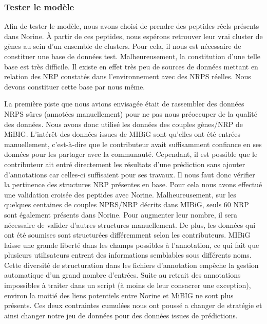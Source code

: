 \subsubsection{Tester le modèle}

Afin de tester le modèle, nous avons choisi de prendre des peptides réels présents dans Norine.
À partir de ces peptides, nous espérons retrouver leur vrai cluster de gènes au sein d'un ensemble de clusters.
Pour cela, il nous est nécessaire de constituer une base de données test.
Malheureusement, la constitution d'une telle base est très difficile.
Il existe en effet très peu de sources de données mettant en relation des NRP constatés dans l'environnement avec des NRPS réelles.
Nous devons constituer cette base par nous même.

La première piste que nous avions envisagée était de rassembler des données NRPS sûres (annotées manuellement) pour ne pas nous préoccuper de la qualité des données.
Nous avons donc utilisé les données des couples gènes/NRP de MiBIG.
L'intérêt des données issues de MIBiG sont qu'elles ont été entrées manuellement, c'est-à-dire que le contributeur avait suffisamment confiance en ses données pour les partager avec la communauté.
Cependant, il est possible que le contributeur ait entré directement les résultats d'une prédiction sans ajouter d'annotations car celles-ci suffisaient pour ses travaux.
Il nous faut donc vérifier la pertinence des structures NRP présentes en base.
Pour cela nous avons effectué une validation croisée des peptides avec Norine.
Malheureusement, sur les quelques centaines de couples NPRS/NRP décrits dans MIBiG, seuls 60 NRP sont également présents dans Norine.
Pour augmenter leur nombre, il sera nécessaire de valider d'autres structures manuellement.
De plus, les données qui ont été soumises sont structurées différemment selon les contributeurs.
MIBiG laisse une grande liberté dans les champs possibles à l'annotation, ce qui fait que plusieurs utilisateurs entrent des informations semblables sous différents noms.
Cette diversité de structuration dans les fichiers d'annotation empêche la gestion automatique d'un grand nombre d'entrées.
Suite au retrait des annotations impossibles à traiter dans un script (à moins de leur consacrer une exception), environ la moitié des liens potentiels entre Norine et MiBIG ne sont plus présents.
Ces deux contraintes cumulées nous ont poussé a changer de stratégie et ainsi changer notre jeu de données pour des données issues de prédictions.

